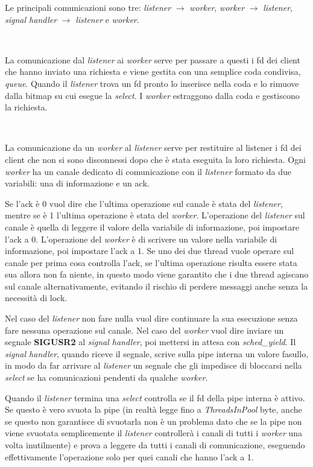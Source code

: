 \documentclass[a4paper]{article}
\theoremstyle{theorem}
\theoremstyle{remark}
\theoremstyle{definition}
\theoremstyle{corollary}
\theoremstyle{lemma}
\newcommand\codeName[1]{%
	\textit{#1}}
\begin{document}
Le principali comunicazioni sono tre: \codeName{listener} $\rightarrow$ \codeName{worker}, \codeName{worker} $\rightarrow$ \codeName{listener}, \codeName{signal handler} $\rightarrow$ \codeName{listener} e \codeName{worker}.

\

La comunicazione dal \codeName{listener} ai \codeName{worker} serve per passare a questi i fd dei client che hanno inviato una richiesta e viene gestita con una semplice coda condivisa, \codeName{queue}. Quando il \codeName{listener} trova un fd pronto lo inserisce nella coda e lo rimuove dalla bitmap su cui esegue la \codeName{select}. I \codeName{worker} estraggono dalla coda e gestiscono la richiesta.

\

La comunicazione da un \codeName{worker} al \codeName{listener} serve per restituire al listener i fd dei client che non si sono disconnessi dopo che è stata eseguita la loro richiesta. Ogni \codeName{worker} ha un canale dedicato di comunicazione con il \codeName{listener} formato da due variabili: una di informazione e un ack.

Se l'ack è 0 vuol dire che l'ultima operazione sul canale è stata del \codeName{listener}, mentre se è 1 l'ultima operazione è stata del \codeName{worker}. L'operazione del \codeName{listener} sul canale è quella di leggere il valore della variabile di informazione, poi impostare l'ack a 0. L'operazione del \codeName{worker} è di scrivere un valore nella variabile di informazione, poi impostare l'ack a 1. Se uno dei due thread vuole operare sul canale per prima cosa controlla l'ack, se l'ultima operazione risulta essere stata sua allora non fa niente, in questo modo viene garantito che i due thread agiscano sul canale alternativamente, evitando il rischio di perdere messaggi anche senza la necessità di lock.

Nel caso del \codeName{listener} non fare nulla vuol dire continuare la sua esecuzione senza fare nessuna operazione sul canale. Nel caso del \codeName{worker} vuol dire inviare un segnale \textbf{SIGUSR2} al \codeName{signal handler}, poi mettersi in attesa con \codeName{sched\_yield}. Il \codeName{signal handler}, quando riceve il segnale, scrive sulla pipe interna un valore fasullo, in modo da far arrivare al \codeName{listener} un segnale che gli impedisce di bloccarsi nella \codeName{select} se ha comunicazioni pendenti da qualche \codeName{worker}.

Quando il \codeName{listener} termina una \codeName{select} controlla se il fd della pipe interna è attivo. Se questo è vero svuota la pipe (in realtà legge fino a \codeName{ThreadsInPool} byte, anche se questo non garantisce di svuotarla non è un problema dato che se la pipe non viene svuotata semplicemente il \codeName{listener} controllerà i canali di tutti i \codeName{worker} una volta inutilmente) e prova a leggere da tutti i canali di comunicazione, eseguendo effettivamente l'operazione solo per quei canali che hanno l'ack a 1.
\end{document}
